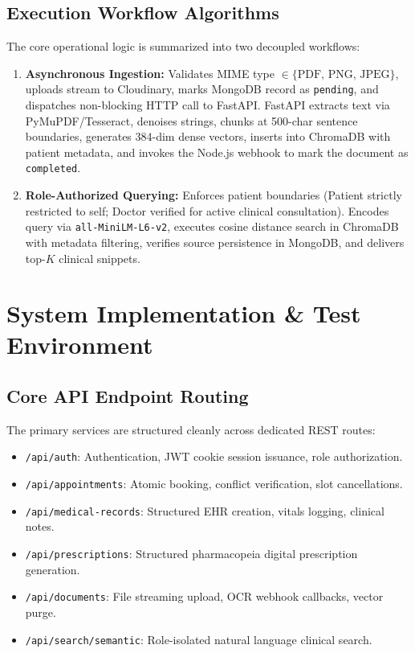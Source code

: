\documentclass[conference]{IEEEtran}
\begin{document}
\subsection{Execution Workflow Algorithms}
The core operational logic is summarized into two decoupled workflows:
\begin{enumerate}
    \item \textbf{Asynchronous Ingestion:} Validates MIME type $\in \{\text{PDF, PNG, JPEG}\}$, uploads stream to Cloudinary, marks MongoDB record as \texttt{pending}, and dispatches non-blocking HTTP call to FastAPI. FastAPI extracts text via PyMuPDF/Tesseract, denoises strings, chunks at 500-char sentence boundaries, generates 384-dim dense vectors, inserts into ChromaDB with patient metadata, and invokes the Node.js webhook to mark the document as \texttt{completed}.
    \item \textbf{Role-Authorized Querying:} Enforces patient boundaries (Patient strictly restricted to self; Doctor verified for active clinical consultation). Encodes query via \texttt{all-MiniLM-L6-v2}, executes cosine distance search in ChromaDB with metadata filtering, verifies source persistence in MongoDB, and delivers top-$K$ clinical snippets.
\end{enumerate}

\section{System Implementation \& Test Environment}

\subsection{Core API Endpoint Routing}
The primary services are structured cleanly across dedicated REST routes:
\begin{itemize}
    \item \texttt{/api/auth}: Authentication, JWT cookie session issuance, role authorization.
    \item \texttt{/api/appointments}: Atomic booking, conflict verification, slot cancellations.
    \item \texttt{/api/medical-records}: Structured EHR creation, vitals logging, clinical notes.
    \item \texttt{/api/prescriptions}: Structured pharmacopeia digital prescription generation.
    \item \texttt{/api/documents}: File streaming upload, OCR webhook callbacks, vector purge.
    \item \texttt{/api/search/semantic}: Role-isolated natural language clinical search.
\end{itemize}
\end{document}
